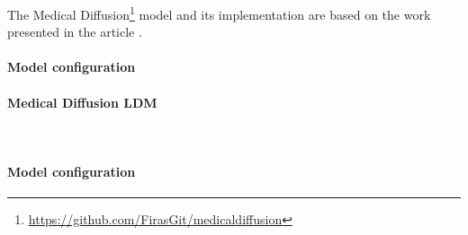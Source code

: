 The Medical Diffusion\footnote{\url{https://github.com/FirasGit/medicaldiffusion}} model and its implementation are based on the work presented in the article \cite{https://doi.org/10.48550/arxiv.2211.03364}. 

\paragraph{Model configuration}



\paragraph{Medical Diffusion LDM}\mbox{}\\
\paragraph{Model configuration}


